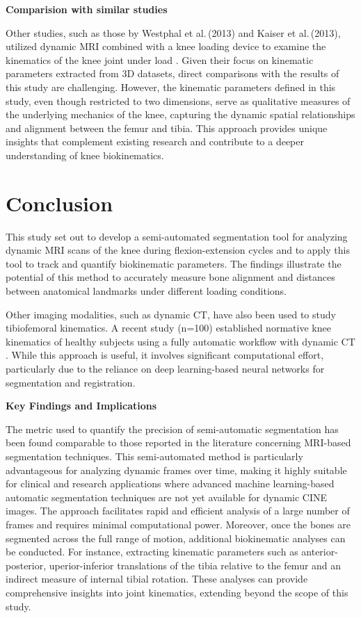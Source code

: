 \documentclass{micro-econ-thesis}
\begin{document}
\textbf{Comparision with similar studies }

Other studies, such as those by Westphal et al.\,(2013) and Kaiser et al.\,(2013), utilized dynamic MRI combined with a knee loading device to examine the kinematics of the knee joint under load \autocites{westphal_load-dependent_2013}{kaiser_measurement_2013}. Given their focus on kinematic parameters extracted from 3D datasets, direct comparisons with the results of this study are challenging. However, the kinematic parameters defined in this study, even though restricted to two dimensions, serve as qualitative measures of the underlying mechanics of the knee, capturing the dynamic spatial relationships and alignment between the femur and tibia. This approach provides unique insights that complement existing research and contribute to a deeper understanding of knee biokinematics.  

\section{Conclusion}
\label{sec:conclusion}
This study set out to develop a semi-automated segmentation tool for analyzing dynamic MRI scans of the knee during flexion-extension cycles and to apply this tool to track and quantify biokinematic parameters. The findings illustrate the potential of this method to accurately measure bone alignment and distances between anatomical landmarks under different loading conditions.

Other imaging modalities, such as dynamic CT, have also been used to study tibiofemoral kinematics. A recent study (n=100) established normative knee kinematics of healthy subjects using a fully automatic workflow with dynamic CT \parencite{dunning_fully_2023}. While this approach is useful, it involves significant computational effort, particularly due to the reliance on deep learning-based neural networks for segmentation and registration. 

\textbf{Key Findings and Implications}

The metric used to quantify the precision of semi-automatic segmentation has been found comparable to those reported in the literature concerning MRI-based segmentation techniques. This semi-automated method is particularly advantageous for analyzing dynamic frames over time, making it highly suitable for clinical and research applications where advanced machine learning-based automatic segmentation techniques are not yet available for dynamic CINE images. The approach facilitates rapid and efficient analysis of a large number of frames and requires minimal computational power. Moreover, once the bones are segmented across the full range of motion, additional biokinematic analyses can be conducted. For instance, extracting kinematic parameters such as anterior-posterior, uperior-inferior translations of the tibia relative to the femur and an indirect measure of internal tibial rotation. These analyses can provide comprehensive insights into joint kinematics, extending beyond the scope of this study.
\end{document}
